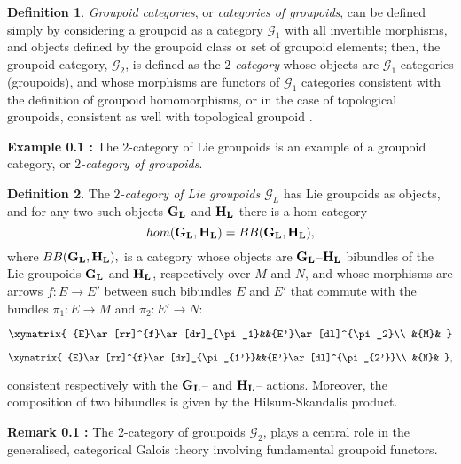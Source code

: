 \documentclass[12pt]{article}
\theoremstyle{plain}
\theoremstyle{definition}
\newtheorem{definition}{Definition}[section]
\numberwithin{equation}{section}
\newcommand{\G}{\mathcal G}
\begin{document}
\begin{definition} 

  \emph{Groupoid categories}, or {\em categories of groupoids}, can be defined
simply by considering a groupoid as a category {\bf $\mathsf{\G}_1$} with all invertible morphisms, and objects
defined by the groupoid class or set of groupoid elements; then, the groupoid category, \textbf{$\mathsf{\G}_2$},
is defined as the \emph{$2$-category} whose objects are \textbf{$\mathsf{\G}_1$} categories (groupoids), and whose morphisms are functors of \textbf{$\mathsf{\G}_1$} categories consistent with the definition of groupoid homomorphisms, or in the case of topological groupoids, consistent as well with topological groupoid 
. 

\end{definition}  

{\bf  Example 0.1 :}
The $2$-category of Lie groupoids is an example of a groupoid category, or \emph{$2$-category of groupoids}.

\begin{definition} 
The \emph{$2$-category of Lie groupoids {\bf $\mathsf{\G}_L$}} has Lie groupoids as objects, and for any two such objects ${\bf G_L}$ and ${\bf H_L}$ there is a hom-category $$hom({\bf G_L},{\bf H_L})= BB({\bf G_L},{\bf H_L}),$$
where  $BB({\bf G_L},{\bf H_L}),$ is a category whose objects are ${\bf G_L}$--${\bf H_L}$ bibundles of the Lie groupoids ${\bf G_L}$ and ${\bf H_L}$, respectively over $M$ and $N$, and whose morphisms are arrows $f:  E \to  E'$ between such bibundles $E$ and $E'$ that commute with the bundles $\pi_1: E \to M$ and $\pi_2: E' \to N:$

$$\xymatrix{
{E}\ar[rr]^{f}\ar[dr]_{\pi_1}&&{E'}\ar[dl]^{\pi_2}\\
&{M}&
}
$$


$$\xymatrix{
{E}\ar[rr]^{f}\ar[dr]_{\pi_{1'}}&&{E'}\ar[dl]^{\pi_{2'}}\\
&{N}&
},
$$


consistent respectively with the ${\bf G_L}$-- and ${\bf H_L}$-- actions. Moreover, the composition of two bibundles is given by the Hilsum-Skandalis product.
\end{definition} 





{\bf Remark 0.1 :}
 The 2-category of groupoids \textbf{$\mathsf{\G}_2$}, plays a central role in the generalised, categorical Galois theory involving fundamental groupoid functors.

\end{document}
